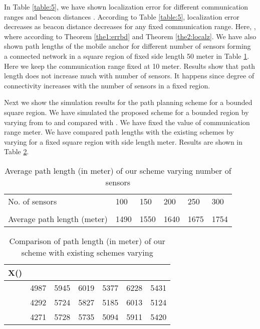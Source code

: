 \documentclass[preprint,11pt]{elsarticle}
\begin{document}
In Table \ref{table:5}, we have shown localization error for different communication ranges  and beacon distances .
According to Table \ref{table:5}, localization error decreases as beacon distance decreases for any fixed communication range.
Here, , where  according to Theorem \ref{the1:errbd} and Theorem  \ref{the2:localz}.
We have also shown path lengths of the mobile anchor for different number of sensors forming a connected network in a square region of fixed side length 50 meter in  Table \ref{table:2}. Here we keep the communication range fixed at 10 meter. Results show that path length does not increase much with number of sensors. It happens since degree of connectivity increases with the number of sensors in a fixed region.

Next we show the simulation results for the path planning scheme for a bounded square region.
We have simulated the proposed scheme for a bounded region by varying  from  to  and compared with
\cite{Chia-Ho-Ou2013}. We have fixed the value of communication range  meter. We have compared path lengths with the existing schemes
by varying  for a fixed square region with side length  meter. Results are shown in Table \ref{table:3}.
\begin{table}[]
\center
\caption{Average path length (in meter) of our scheme varying number of sensors}
\label{table:2}
\begin{tabular}{p{4cm}|p{1.5cm}|p{1.5cm}|p{1.5cm}|p{1.5cm}|p{1.5cm}}
\hline
\hline
   No. of sensors  & 100   & 150     & 200  & 250     & 300  \\
  &      &     &  & &      \\
\hline
 Average path length (meter) & 1490 & 1550 & 1640 & 1675 & 1754   \\
\hline
\hline
\end{tabular}
\end{table}
\begin{table}[h]
\center
\caption{Comparison of path length (in meter) of our scheme with existing schemes varying }
\label{table:3}
\begin{tabular}
{p{1cm}|p{1.4cm}|p{2.2cm}|p{1.6cm} |p{1.4cm}|p{1.4cm}|p{1.4cm}}
\hline
\hline
X() &   &   &   &   &  &  \\
\hline
 & 4987 & 5945 & 6019 & 5377 & 6228 & 5431 \\
 & 4292 & 5724 & 5827 & 5185 & 6013 & 5124 \\
 & 4271 & 5728 & 5735 & 5094 & 5911 & 5420 \\
\hline
\hline
\end{tabular}
\end{table}
\end{document}
